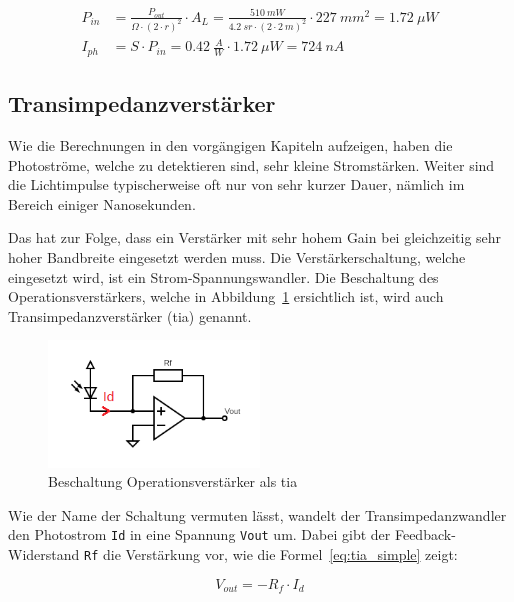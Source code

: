 \begin{equation}\label{eq:photocurrent_scenario2}
    \begin{split}
        P_{in} &= \frac{P_{out}}{\Omega \cdot (2 \cdot r)^2} \cdot A_{L} = \frac{510~mW}{4.2~sr \cdot (2 \cdot 2~m)^2} \cdot 227~mm^2 = 1.72~\mu W\\
        I_{ph} &= S \cdot P_{in} = 0.42~\frac{A}{W} \cdot 1.72~\mu W = 724~nA
    \end{split}
\end{equation}
\myequations{}

\pagebreak

\subsection{Transimpedanzverstärker}

Wie die Berechnungen in den vorgängigen Kapiteln aufzeigen, haben die Photoströme, welche zu detektieren sind, sehr kleine
Stromstärken. Weiter sind die Lichtimpulse typischerweise oft nur von sehr kurzer Dauer, nämlich im Bereich einiger Nanosekunden.

Das hat zur Folge, dass ein Verstärker mit sehr hohem Gain bei gleichzeitig sehr hoher Bandbreite eingesetzt werden muss.
Die Verstärkerschaltung, welche eingesetzt wird, ist ein Strom-Spannungswandler. Die Beschaltung des Operationsverstärkers,
welche in Abbildung~\ref{fig:theory_tia} ersichtlich ist, wird auch Transimpedanzverstärker (\acrshort{tia}) genannt.

\begin{figure}[H]
    \centering
    \includegraphics[width=0.5\textwidth]{graphics/theory_tia.png}
    \caption{Beschaltung Operationsverstärker als \acrshort{tia}}\label{fig:theory_tia}
\end{figure}

Wie der Name der Schaltung vermuten lässt, wandelt der Transimpedanzwandler den Photostrom \lstinline|Id| in eine Spannung
\lstinline|Vout| um. Dabei gibt der Feedback-Widerstand \lstinline|Rf| die Verstärkung vor, wie die Formel~\ref{eq:tia_simple}
zeigt:

\begin{equation}\label{eq:tia_simple}
    V_{out} = -R_{f} \cdot I_{d}
\end{equation}
